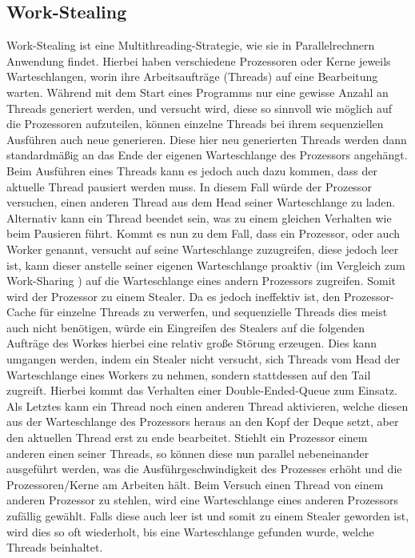 \documentclass{TUBAFarbeiten}
\begin{document}
\subsection{Work-Stealing}
\label{WorkStealing}
Work-Stealing ist eine Multithreading-Strategie, wie sie in Parallelrechnern Anwendung findet. Hierbei haben verschiedene Prozessoren oder Kerne jeweils Warteschlangen, worin ihre Arbeitsaufträge (Threads) auf eine Bearbeitung warten. Während mit dem Start eines Programms nur eine gewisse Anzahl an Threads generiert werden, und versucht wird, diese so sinnvoll wie möglich auf die Prozessoren aufzuteilen, können einzelne Threads bei ihrem sequenziellen Ausführen auch neue generieren. Diese hier neu generierten Threads werden dann standardmäßig an das Ende der eigenen Warteschlange des Prozessors angehängt. Beim Ausführen eines Threads kann es jedoch auch dazu kommen, dass der aktuelle Thread pausiert werden muss. In diesem Fall würde der Prozessor versuchen, einen anderen Thread aus dem Head seiner Warteschlange zu laden. Alternativ kann ein Thread beendet sein, was zu einem gleichen Verhalten wie beim Pausieren führt. Kommt es nun zu dem Fall, dass ein Prozessor, oder auch Worker genannt, versucht auf seine Warteschlange zuzugreifen, diese jedoch leer ist, kann dieser anstelle seiner eigenen Warteschlange proaktiv (im Vergleich zum Work-Sharing \cite[721]{blumofe1999scheduling}) auf die Warteschlange eines andern Prozessors zugreifen. Somit wird der Prozessor zu einem Stealer. Da es jedoch ineffektiv ist, den Prozessor-Cache für einzelne Threads zu verwerfen, und sequenzielle Threads dies meist auch nicht benötigen, würde ein Eingreifen des Stealers auf die folgenden Aufträge des Workes hierbei eine relativ große Störung erzeugen. Dies kann umgangen werden, indem ein Stealer nicht versucht, sich Threads vom Head der Warteschlange eines Workers zu nehmen, sondern stattdessen auf den Tail zugreift. Hierbei kommt das Verhalten einer Double-Ended-Queue zum Einsatz. Als Letztes kann ein Thread noch einen anderen Thread aktivieren, welche diesen aus der Warteschlange des Prozessors heraus an den Kopf der Deque setzt, aber den aktuellen Thread erst zu ende bearbeitet.
Stiehlt ein Prozessor einem anderen einen seiner Threads, so können diese nun parallel nebeneinander ausgeführt werden, was die Ausführgeschwindigkeit des Prozesses erhöht und die Prozessoren/Kerne am Arbeiten hält. Beim Versuch einen Thread von einem anderen Prozessor zu stehlen, wird eine Warteschlange eines anderen Prozessors zufällig gewählt. Falls diese auch leer ist und somit zu einem Stealer geworden ist, wird dies so oft wiederholt, bis eine Warteschlange gefunden wurde, welche Threads beinhaltet. 
\end{document}
